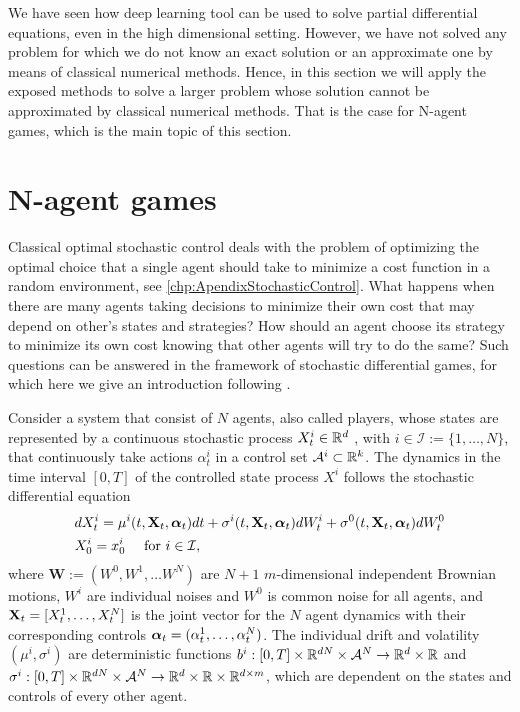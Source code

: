 We have seen how deep learning tool can be used to solve partial differential equations, even in the high dimensional setting. However, we have not solved any problem for which we do not know an exact solution or an approximate one by means of classical numerical methods. Hence, in this section we will apply the exposed methods to solve a larger problem whose solution cannot be approximated by classical numerical methods. That is the case for N-agent games, which is the main topic of this section. 
\section{N-agent games}
Classical optimal stochastic control deals with the problem of optimizing the optimal choice that a single agent should take to minimize a cost function in a random environment, see \autoref{chp:ApendixStochasticControl}.  What happens when there are many agents taking decisions to minimize their own cost that may depend on other's states and strategies? How should an agent choose its strategy to minimize its own cost knowing that other agents will try to do the same?  Such questions can be answered in the framework of stochastic differential games, for which here we give an introduction following \cite{hu_recent_nodate,han_deep_2020}.

Consider a system that consist of $N$ agents, also called players, whose states are represented by a continuous stochastic process $X^{i}_{t}\in \mathbb{R}^d$ , with $i\in \mathcal{I}:=\{1,\ldots, N\}$, that continuously take actions $\alpha_{t}^{i}$ in a control set $\mathcal{A}^i\subset \mathbb{R}^k$. The dynamics in the time interval $[0,T]$ of the controlled state process $X^i$ follows the stochastic differential equation
\begin{equation}
	\begin{split}
		&dX_t^{i}=\mu^{i}(t,\mathbf{X}_t,\bm{\alpha}_t)dt+\sigma^{i}(t,\mathbf{X}_t,\bm{\alpha}_t)dW_t^{i}+\sigma^{0}(t,\mathbf{X}_t,\bm{\alpha}_t)dW_{t}^0\\
		&X_{0}^{i}=x_{0}^{i} \quad \text{ for } i\in \mathcal{I},
	\end{split}
\end{equation}
where $\mathbf{W}:=(W^0,W^1,\ldots W^N)$ are $N+1$ $m$-dimensional independent Brownian motions, $W^{i}$ are individual noises and $W^0$ is common noise for all agents, and $\mathbf{X}_t=[X_t^1,\ldots,X_t^N]$ is the joint vector for the $N$ agent dynamics with their corresponding controls $\bm{\alpha}_t=(\alpha_t^1,\ldots,\alpha_t^N)$. The individual drift and volatility $(\mu^i,\sigma^i)$ are deterministic functions $b^{i}:[0,T]\times \mathbb{R}^{dN}\times \mathcal{A}^N\to \mathbb{R}^d\times \mathbb{R}$ and $\sigma^{i}:[0,T]\times \mathbb{R}^{dN}\times \mathcal{A}^N\to \mathbb{R}^d\times \mathbb{R}\times\mathbb{R}^{d\times m}$, which are dependent on the states and controls of every other agent.

